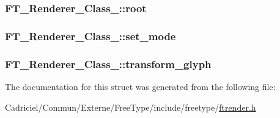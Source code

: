 \hypertarget{struct_f_t___renderer___class___a3df4509f1de704596bf4237d6ff8cbd4}{
\subsubsection[{root}]{ F\-T\-\_\-\-Renderer\-\_\-\-Class\-\_\-\-::root}}\label{struct_f_t___renderer___class___a3df4509f1de704596bf4237d6ff8cbd4}
\hypertarget{struct_f_t___renderer___class___a7cfd4795107157aad4f7efcab77a0f64}{
\subsubsection[{set\-\_\-mode}]{ F\-T\-\_\-\-Renderer\-\_\-\-Class\-\_\-\-::set\-\_\-mode}}\label{struct_f_t___renderer___class___a7cfd4795107157aad4f7efcab77a0f64}
\hypertarget{struct_f_t___renderer___class___a2aef09ecdabacf5628ef29fb3d179def}{
\subsubsection[{transform\-\_\-glyph}]{ F\-T\-\_\-\-Renderer\-\_\-\-Class\-\_\-\-::transform\-\_\-glyph}}\label{struct_f_t___renderer___class___a2aef09ecdabacf5628ef29fb3d179def}


The documentation for this struct was generated from the following file\-:\begin{DoxyCompactItemize}
\item 
Cadriciel/\-Commun/\-Externe/\-Free\-Type/include/freetype/\hyperlink{ftrender_8h}{ftrender.\-h}\end{DoxyCompactItemize}
